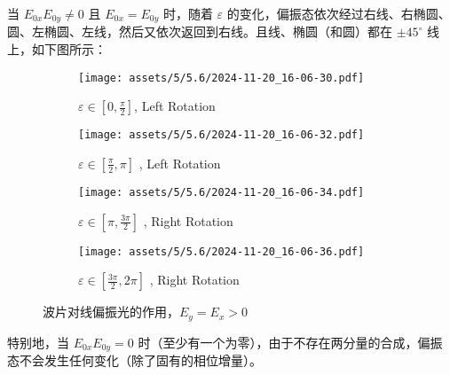 \documentclass[UTF8]{report}
\theoremstyle{MyLineTheoremStyle} %
\theoremstyle{MyBlockTheoremStyle} %
\theoremstyle{MySubsubsectionStyle} %
\begin{document}
当 $E_{0x}E_{0y} \ne 0$ 且 $E_{0x} = E_{0y}$ 时，随着 $\varepsilon$ 的变化，偏振态依次经过右线、右椭圆、圆、左椭圆、左线，然后又依次返回到右线。且线、椭圆（和圆）都在 $\pm 45^\circ$ 线上，如下图所示：

\begin{figure}[H]\centering
    \begin{subfigure}[b]{0.24\columnwidth}\centering
        \texttt{[image: assets/5/5.6/2024-11-20\_16-06-30.pdf]}
        \caption{$\varepsilon \in [0, \frac{\pi}{2}]$, Left Rotation}
    \end{subfigure}
    \begin{subfigure}[b]{0.24\columnwidth}\centering
        \texttt{[image: assets/5/5.6/2024-11-20\_16-06-32.pdf]}
        \caption{$\varepsilon \in [\frac{\pi}{2}, \pi]$ , Left Rotation}
    \end{subfigure}
    \begin{subfigure}[b]{0.24\columnwidth}\centering
        \texttt{[image: assets/5/5.6/2024-11-20\_16-06-34.pdf]}
        \caption{$\varepsilon \in [\pi, \frac{3\pi}{2}]$ , Right Rotation}
    \end{subfigure}
    \begin{subfigure}[b]{0.24\columnwidth}\centering
        \texttt{[image: assets/5/5.6/2024-11-20\_16-06-36.pdf]}
        \caption{$\varepsilon \in [\frac{3\pi}{2}, 2\pi]$ , Right Rotation}
    \end{subfigure}
    \caption{波片对线偏振光的作用，$E_y = E_x > 0$}
\end{figure}

特别地，当  $E_{0x}E_{0y} = 0$ 时（至少有一个为零），由于不存在两分量的合成，偏振态不会发生任何变化（除了固有的相位增量）。


\end{document}
